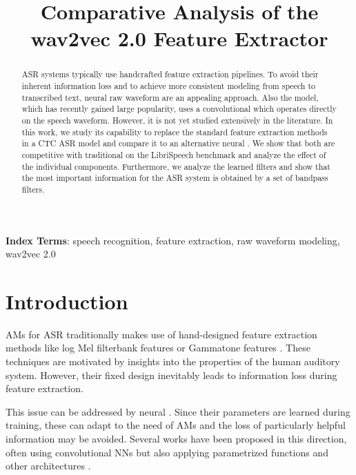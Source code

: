 \documentclass{INTERSPEECH2023}
\title{Comparative Analysis of the wav2vec 2.0 Feature Extractor}
\begin{document}
\maketitle
 
\begin{abstract}
\Gls{ASR} systems typically use handcrafted feature extraction pipelines.
To avoid their inherent information loss and to achieve more consistent modeling from speech to transcribed text, neural raw waveform \fes are an appealing approach.
Also the \wvtwo model, which has recently gained large popularity, uses a convolutional \fe which operates directly on the speech waveform.
However, it is not yet studied extensively in the literature.
In this work, we study its capability to replace the standard feature extraction methods in a \gls{CTC} \gls{ASR} model and compare it to an alternative neural \fe.
We show that both are competitive with traditional \fes on the LibriSpeech benchmark and analyze the effect of the individual components.
Furthermore, we analyze the learned filters and show that the most important information for the \gls{ASR} system is obtained by a set of bandpass filters.
\end{abstract}
\noindent\textbf{Index Terms}: speech recognition, feature extraction, raw waveform modeling, wav2vec 2.0

\glsresetall

\section{Introduction}
\glspl{AM} for \gls{ASR} traditionally makes use of hand-designed feature extraction methods like log Mel filterbank features or Gammatone features \cite{schlueter:icassp07}.
These techniques are motivated by insights into the properties of the human auditory system.
However, their fixed design inevitably leads to information loss during feature extraction.

This issue can be addressed by neural \fes.
Since their parameters are learned during training, these \fes can adapt to the need of \glspl{AM} and the loss of particularly helpful information may be avoided.
Several works have been proposed in this direction, often using convolutional \glspl{NN} \cite{palaz2015convolutional, golik15:cnn, tuske2018:waveform} but also applying parametrized functions \cite{ravanelli2018sincnet} and other architectures \cite{sainath2015cldnn}.
\end{document}

